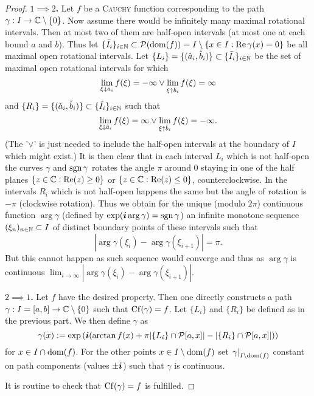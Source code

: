 \documentclass[10pt,a4paper]{article}
\begin{document}
\begin{proof}
\textbf{$1\implies 2$.}
Let $f$ be a \textsc{Cauchy} function corresponding to the path $\gamma:I\rightarrow\mathbb{C}\setminus\{0\}$.
Now assume there would be infinitely many maximal rotational intervals. Then at most two of them are half-open intervals (at most one at each bound $a$ and $b$). Thus let $\{\bar{I}_i\}_{i\in\mathbb{N}}\subset\mathcal{P}(\operatorname{dom}(f))=I\setminus\{x\in I:\operatorname{Re}{\gamma(x)}=0\}$ be all maximal open rotational intervals.
Let $\{L_i\}=\{(\hat{a}_i,\hat{b}_i)\}\subset\{\bar{I}_i\}_{i\in\mathbb{N}}$ be the set of maximal open rotational intervals for which
\begin{equation}
\lim_{\xi\downarrow \hat{a}_i}{f(\xi)}=-\infty \vee \lim_{\xi\uparrow \hat{b}_i}{f(\xi)}=\infty
\end{equation}
and $\{R_i\}=\{(\check{a}_i,\check{b}_i)\}\subset\{\tilde{I}_i\}_{i\in\mathbb{N}}$ such that
\begin{equation}
\lim_{\xi\downarrow \hat{a}_i}{f(\xi)}=\infty \vee \lim_{\xi\uparrow \hat{b}_i}{f(\xi)}=-\infty\text{.}
\end{equation}
(The '$\vee$' is just needed to include the half-open intervals at the boundary of $I$ which might exist.)
It is then clear that in each interval $L_i$ which is not half-open the curves $\gamma$ and $\operatorname{sgn}{\gamma}$ rotates the angle $\pi$ around $0$ staying in one of the half planes $\{z\in\mathbb{C}:\operatorname{Re}(z)\geq 0\}$ or $\{z\in\mathbb{C}:\operatorname{Re}(z)\leq 0\}$, counterclockwise. In the intervals $R_i$ which is not half-open happens the same but the angle of rotation is $-\pi$ (clockwise rotation). Thus we obtain for the unique (modulo $2\pi$) continuous function $\arg{\gamma}$ (defined by $\exp(\boldsymbol{i}\arg{\gamma})=\operatorname{sgn}{\gamma}$) an infinite monotone sequence $(\xi_n)_{n\in\mathbb{N}}\subset I$ of distinct boundary points of these intervals such that 
\begin{equation}
|\arg{\gamma(\xi_i)}-\arg{\gamma(\xi_{i+1})}|=\pi\text{.}
\end{equation}
But this cannot happen as such sequence would converge and thus as $\arg{\gamma}$ is continuous $\lim_{i\to\infty}{|\arg{\gamma(\xi_i)}-\arg{\gamma(\xi_{i+1})}|}$.

\textbf{$2\implies1$.} Let $f$ have the desired property. Then one directly constructs a path $\gamma:I=[a,b]\rightarrow\mathbb{C}\setminus\{0\}$ such that $\operatorname{Cf}(\gamma)=f$. Let $\{L_i\}$ and $\{R_i\}$ be defined as in the previous part.
We then define $\gamma$ as
\begin{equation}
\gamma(x):=\exp\left(\boldsymbol{i}(\arctan{f(x)}+\pi|\{L_i\}\cap\mathcal{P}{[a,x]}|-|\{R_i\}\cap\mathcal{P}{[a,x]}|)\right)
\end{equation}
for $x\in I\cap\operatorname{dom}(f)$. For the other points $x\in I\setminus\operatorname{dom}(f)$ set $\left. \gamma\right\vert_{I\setminus\operatorname{dom}(f)}$ constant on path components (values $\pm\boldsymbol{i}$) such that $\gamma$ is continuous.

It is routine to check that $\operatorname{Cf}(\gamma)=f$ is fulfilled. 
\end{proof}
\end{document}
